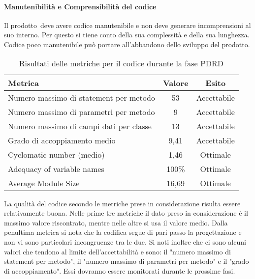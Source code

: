 \documentclass[../PianoDiQualifica.tex]{subfiles}
\begin{document}
\begin{appendices}
			\paragraph{Manutenibilità e Comprensibilità del codice}
				Il prodotto\g\ deve avere codice manutenibile e non deve generare incomprensioni al suo interno. Per questo si tiene conto della sua complessità e della sua lunghezza. Codice poco manutenibile può portare all'abbandono dello sviluppo del prodotto\g.
			\begin{table}[H]
				\centering
				\begin{tabular}{l * {2}{c}}
					\toprule
					\textbf{Metrica} & \textbf{Valore} & \textbf{Esito} \\
					\midrule
					Numero massimo di statement per metodo & 53 & Accettabile \\
					Numero massimo di parametri per metodo & 9 & Accettabile \\
					Numero massimo di campi dati per classe & 13 & Accettabile \\
					Grado di accoppiamento medio & 9,41 & Accettabile \\
					Cyclomatic number (medio) & 1,46 & Ottimale \\
					Adequacy of variable names & 100\% & Ottimale \\
					Average Module Size & 16,69 & Ottimale \\
					\midrule
				\end{tabular}
				\caption{Risultati delle metriche per il codice durante la fase PDRD}
				\label{tab:numero_statement_metodo}
			\end{table}
			La qualità del codice secondo le metriche prese in considerazione risulta essere relativamente buona. Nelle prime tre metriche il dato preso in considerazione è il massimo valore riscontrato, mentre nelle altre si usa il valore medio. Dalla penultima metrica si nota che la codifica segue di pari passo la progettazione e non vi sono particolari incongruenze tra le due. Si noti inoltre che ci sono alcuni valori che tendono al limite dell'accettabilità e sono: il "numero massimo di statement per metodo", il "numero massimo di parametri per metodo"  e il "grado di accoppiamento". Essi dovranno essere monitorati durante le prossime fasi.  
			

\end{appendices}
\end{document}
